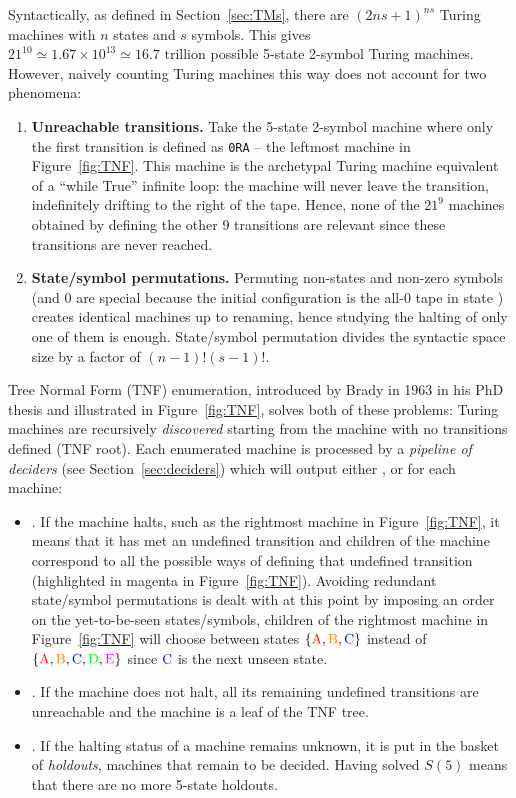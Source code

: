 Syntactically, as defined in Section~\ref{sec:TMs}, there are $(2ns + 1)^{ns}$ Turing machines with $n$ states and $s$ symbols. This gives $21^{10} \simeq 1.67\times10^{13} \simeq 16.7 \text{ trillion}$ possible 5-state 2-symbol Turing machines. However, naively counting Turing machines this way does not account for two phenomena:
\begin{enumerate}
    \item \textbf{Unreachable transitions.} Take the 5-state 2-symbol machine where only the first transition is defined as \texttt{0RA} -- the leftmost machine in Figure~\ref{fig:TNF}. This machine is the archetypal Turing machine equivalent of a ``while True'' infinite loop: the machine will never leave the transition, indefinitely drifting to the right of the tape. Hence, none of the $21^9$ machines obtained by defining the other 9 transitions are relevant since these transitions are never reached.
    \item \textbf{State/symbol permutations.} Permuting non-\stateA states and non-zero symbols (\stateA and 0 are special because the initial configuration is the all-0 tape in state \stateA) creates identical machines up to renaming, hence studying the halting of only one of them is enough. State/symbol permutation divides the syntactic space size by a factor of $(n-1)! (s-1)!$.
\end{enumerate}

Tree Normal Form (TNF) enumeration, introduced by Brady in 1963 in his PhD thesis \cite{Brady64} and illustrated in Figure~\ref{fig:TNF}, solves both of these problems: Turing machines are recursively \textit{discovered} starting from the machine with no transitions defined (TNF root). Each enumerated machine is processed by a \textit{pipeline of deciders} (see Section~\ref{sec:deciders}) which will output either \HALT, \NONHALT or \UNKNOWN for each machine:
\begin{itemize}
    \item \HALT. If the machine halts, such as the rightmost machine in Figure~\ref{fig:TNF}, it means that it has met an undefined transition and children of the machine correspond to all the possible ways of defining that undefined transition (highlighted in magenta in Figure~\ref{fig:TNF}). Avoiding redundant state/symbol permutations is dealt with at this point by imposing an order on the yet-to-be-seen states/symbols, \eg children of the rightmost machine in Figure~\ref{fig:TNF} will choose between states $\{\text{\stateA},\text{\stateB},\text{\stateC}\}$ instead of $\{\text{\stateA},\text{\stateB},\text{\stateC},\text{\stateD},\text{\stateE}\}$ since $\text{\stateC}$ is the next unseen state.

    \item  \NONHALT. If the machine does not halt, all its remaining undefined transitions are unreachable and the machine is a leaf of the TNF tree.
    \item \UNKNOWN. If the halting status of a machine remains unknown, it is put in the basket of \textit{holdouts}, \ie machines that remain to be decided. Having solved $S(5)$ means that there are no more 5-state holdouts.
\end{itemize}


